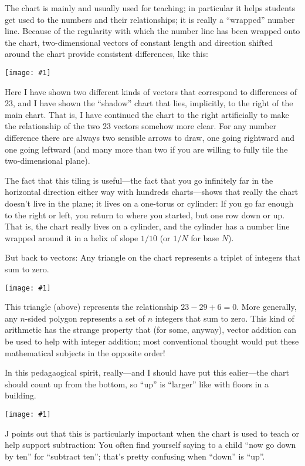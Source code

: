 \documentclass[12pt,pdftex]{article}
\newcommand{\showchart}[1]{\texttt{[image: \#1]}}
\begin{document}
The chart is mainly and usually used for teaching; in particular it
helps students get used to the numbers and their relationships; it is
really a ``wrapped'' number line.  Because of the regularity with
which the number line has been wrapped onto the chart, two-dimensional
vectors of constant length and direction shifted around the chart
provide consistent differences, like this:
\begin{center}
\showchart{hundreds_chart_tr_23.pdf}
\end{center}
Here I have shown two different kinds of vectors that correspond to
differences of 23, and I have shown the ``shadow'' chart that lies,
implicitly, to the right of the main chart.  That is, I have continued
the chart to the right artificially to make the relationship of the
two 23 vectors somehow more clear.  For any number difference there
are always two sensible arrows to draw, one going rightward and one
going leftward (and many more than two if you are willing to fully
tile the two-dimensional plane).

The fact that this tiling is useful---the fact that you go infinitely
far in the horizontal direction either way with hundreds
charts---shows that really the chart doesn't live in the plane; it
lives on a one-torus or cylinder: If you go far enough to the right or
left, you return to where you started, but one row down or up.  That
is, the chart really lives on a cylinder, and the cylinder has a
number line wrapped around it in a helix of slope $1/10$ (or $1/N$ for
base $N$).

But back to vectors: Any triangle on the chart represents a triplet of
integers that sum to zero.
\begin{center}
\showchart{hundreds_chart_triangle.pdf}
\end{center}
This triangle (above) represents the relationship $23-29+6=0$.  More
generally, any $n$-sided polygon represents a set of $n$ integers that
sum to zero.  This kind of arithmetic has the strange property that
(for some, anyway), vector addition can be used to help with integer
addition; most conventional thought would put these mathematical
subjects in the opposite order!

In this pedagaogical spirit, really---and I should have put this
ealier---the chart should count up from the bottom, so ``up'' is
``larger'' like with floors in a building.
\begin{center}
\showchart{hundreds_chart_bottomup.pdf}
\end{center}
J points out that this is particularly important when the chart is
used to teach or help support subtraction: You often find yourself
saying to a child ``now go down by ten'' for ``subtract ten''; that's
pretty confusing when ``down'' is ``up''.
\end{document}
